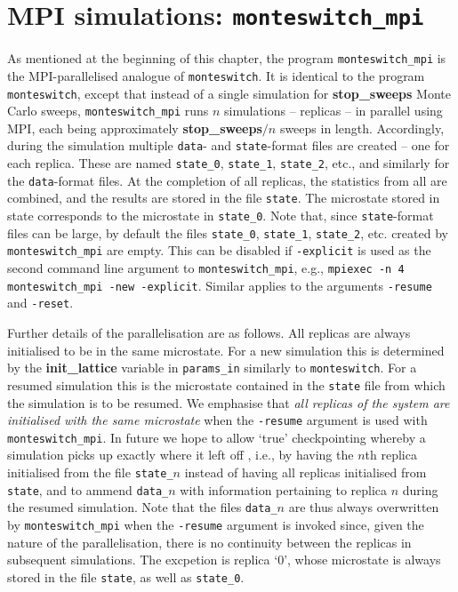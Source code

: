 \documentclass{report}
\begin{document}
\section{MPI simulations: \texttt{monteswitch\_mpi}}
As mentioned at the beginning of this chapter, the program \texttt{monteswitch\_mpi} is the MPI-parallelised analogue of \texttt{monteswitch}. 
It is identical to the program \texttt{monteswitch}, except that instead of a single simulation for \textbf{stop\_sweeps} Monte Carlo sweeps, 
\texttt{monteswitch\_mpi} runs $n$ simulations -- replicas -- in parallel using MPI, each being approximately \textbf{stop\_sweeps}$/n$ sweeps in 
length. Accordingly, during the simulation multiple \texttt{data}- and \texttt{state}-format files are created -- one for each replica. These 
are named \texttt{state\_0}, \texttt{state\_1}, \texttt{state\_2}, etc., and similarly for the \texttt{data}-format files. At the completion of 
all replicas, the statistics from all are combined, and the results are stored in the file \texttt{state}. The microstate stored in state
corresponds to the microstate in \texttt{state\_0}. 
Note that, since \texttt{state}-format files can be large, by default the files \texttt{state\_0}, \texttt{state\_1}, 
\texttt{state\_2}, etc. created by \texttt{monteswitch\_mpi} are empty. This can be disabled if \texttt{-explicit} is used as the second command line 
argument to \texttt{monteswitch\_mpi}, e.g., \texttt{mpiexec -n 4 monteswitch\_mpi -new -explicit}. Similar applies to the arguments \texttt{-resume} and 
\texttt{-reset}.

Further details of the parallelisation are as follows. All replicas are always initialised to be in the same microstate. For a new simulation this is 
determined by the \textbf{init\_lattice} variable in \texttt{params\_in} similarly to \texttt{monteswitch}. For a resumed simulation this is the microstate 
contained in the \texttt{state} file from which the simulation is to be resumed. We emphasise that \emph{all replicas of the system are initialised with 
the same microstate} when the \texttt{-resume} argument is used with \texttt{monteswitch\_mpi}. In future we hope to allow `true' checkpointing 
whereby a simulation picks up exactly where it left off , i.e., by having the $n$th replica initialised from the file \texttt{state\_}$n$ instead of having
all replicas initialised from \texttt{state}, and to ammend \texttt{data\_}$n$ with information pertaining to replica $n$ during the resumed
simulation. Note that the files \texttt{data\_}$n$ are thus always overwritten by \texttt{monteswitch\_mpi} when the \texttt{-resume} argument is
invoked since, given the nature of the parallelisation, there is no continuity between the replicas in subsequent simulations. The excpetion is replica `0',
whose microstate is always stored in the file \texttt{state}, as well as \texttt{state\_0}.
\end{document}
